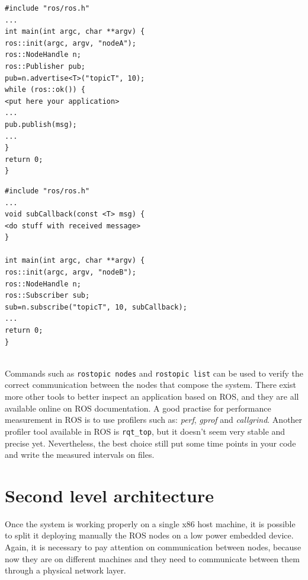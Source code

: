 \noindent\begin{minipage}{.48\textwidth}
\begin{verbatim}
#include "ros/ros.h"
...
int main(int argc, char **argv) {
ros::init(argc, argv, "nodeA");
ros::NodeHandle n;
ros::Publisher pub;
pub=n.advertise<T>("topicT", 10);
while (ros::ok()) {
<put here your application>
...
pub.publish(msg);
...
}
return 0;
}
\end{verbatim}
\label{lst:pub}
\end{minipage}\hfill
\begin{minipage}{.48\textwidth}
\begin{verbatim}
#include "ros/ros.h"
...
void subCallback(const <T> msg) {
<do stuff with received message>
}

int main(int argc, char **argv) {
ros::init(argc, argv, "nodeB");
ros::NodeHandle n;
ros::Subscriber sub;
sub=n.subscribe("topicT", 10, subCallback);
...
return 0;
}
\end{verbatim}
\label{lst:sub}
\end{minipage}
\\

Commands such as \texttt{rostopic nodes} and \texttt{rostopic list} can be used to verify the correct communication between the nodes that compose the system.
There exist more other tools to better inspect an application based on ROS, and they are all available online on ROS documentation.
A good practise for performance measurement in ROS is to use profilers such as: \textit{perf}, \textit{gprof} and \textit{callgrind}. Another profiler tool available in ROS is \texttt{rqt_top}, but it doesn't seem very stable and precise yet. Nevertheless, the best choice still put some time points in your code and write the measured intervals on files.



\section{Second level architecture}
Once the system is working properly on a single x86 host machine, it is possible to split it deploying manually the ROS nodes on a low power embedded device.
Again, it is necessary to pay attention on communication between nodes, because now they are on different machines and they need to communicate between them through a physical network layer.

